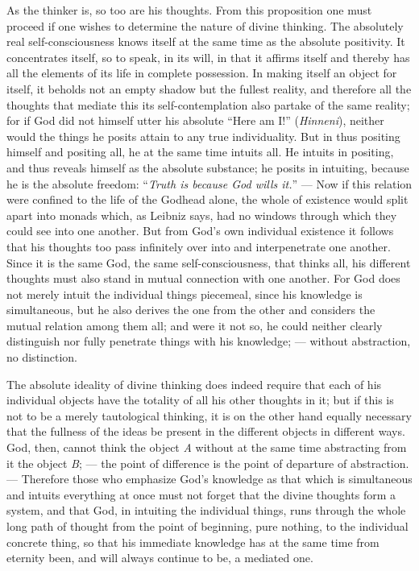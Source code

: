 \documentclass[12pt]{book}
\newcommand{\opage}[1]{\marginnote{\footnotesize\textit{[#1]}}}
\begin{document}
As the thinker is, so too are his thoughts. From this proposition one must
proceed if one wishes to determine the nature of divine thinking. The
absolutely real self-consciousness knows itself at the same time as the
absolute positivity. It concentrates itself, so to speak, in its will, in that
it affirms itself and thereby has all the elements of its life in complete
possession. In making itself an object for itself, it beholds not an empty
shadow but the fullest reality, and therefore all the thoughts that mediate
this its self-contemplation also partake of the same reality; for if God did
not himself utter his absolute ``Here am I!'' (\emph{Hinneni}), neither would
the things he posits attain to any true individuality. But in thus positing
himself and positing all, he at the same time intuits all. He intuits in
positing, and thus reveals himself as the absolute substance; he posits in
intuiting, because he is the absolute freedom: ``\emph{Truth is because God
wills it.}'' --- Now if this relation were confined to the life of the Godhead
alone, the whole of existence would split apart into monads which, as Leibniz
says, had no windows through which they could see into one another. But from
God's own individual existence it follows that his thoughts too pass infinitely
over into and interpenetrate one another. Since it is the same God, the same
self-consciousness, that thinks all, his different thoughts must also stand in
mutual connection with one another. For God does not merely intuit the
individual things piecemeal, since his knowledge is simultaneous, but he also
derives the one from the other and considers the mutual relation among them
all; and were it not so, he could neither clearly distinguish nor
\opage{44} fully penetrate things with his knowledge; --- without abstraction,
no distinction.

The absolute ideality of divine thinking does indeed require that each of his
individual objects have the totality of all his other thoughts in it; but if
this is not to be a merely tautological thinking, it is on the other hand
equally necessary that the fullness of the ideas be present in the different
objects in different ways. God, then, cannot think the object \textit{A}
without at the same time abstracting from it the object \textit{B}; --- the
point of difference is the point of departure of abstraction. --- Therefore
those who emphasize God's knowledge as that which is simultaneous and intuits
everything at once must not forget that the divine thoughts form a system, and
that God, in intuiting the individual things, runs through the whole long path
of thought from the point of beginning, pure nothing, to the individual
concrete thing, so that his immediate knowledge has at the same time from
eternity been, and will always continue to be, a mediated one.
\end{document}
